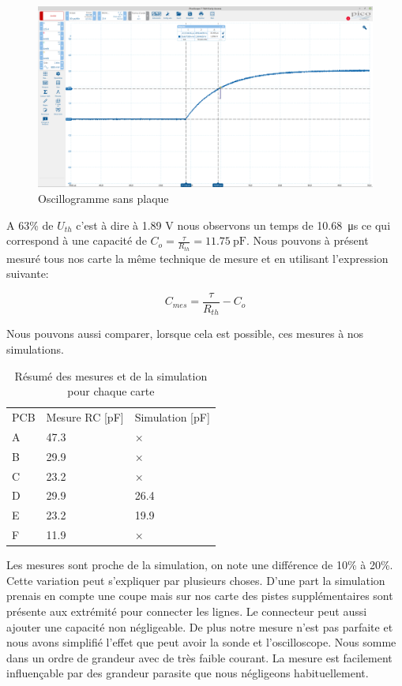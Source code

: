 \begin{figure}[!ht]
\centering
 \includegraphics[width=14cm]{videe.png}
 \caption{Oscillogramme sans plaque}
\end{figure}

A 63\% de $U_{th}$ c'est à dire à 1.89 V nous observons un temps de \SI{10.68}{\micro\second} ce qui correspond à une capacité de $C_o = \frac{\tau}{R_{th}}= \SI{11.75}{\pico\farad}$. Nous pouvons à présent mesuré tous nos carte la même technique de mesure et en utilisant l'expression suivante:

\begin{equation}
 C_{mes} = \frac{\tau}{R_{th}} - C_o
\end{equation}

Nous pouvons aussi comparer, lorsque cela est possible, ces mesures à nos simulations. 

\begin{table}[!ht]
\begin{center}
\begin{tabular}[c]{lll}
PCB & Mesure RC [pF] & Simulation [pF]\\
A & 47.3 & ×\\
B & 29.9 & ×\\
C & 23.2 & ×\\
D & 29.9 & 26.4\\
E & 23.2 & 19.9\\
F & 11.9 & ×
\end{tabular}
\caption{Résumé des mesures et de la simulation pour chaque carte }
\end{center}
\end{table}


Les mesures sont proche de la simulation, on note une différence de 10\% à 20\%. Cette variation peut s'expliquer par plusieurs choses. D'une part la simulation prenais en compte une coupe mais sur nos carte des pistes supplémentaires sont présente aux extrémité pour connecter les lignes. Le connecteur peut aussi ajouter une capacité non négligeable. De plus notre mesure n'est pas parfaite et nous avons simplifié l'effet que peut avoir la sonde et l'oscilloscope. Nous somme dans un ordre de grandeur avec de très faible courant. La mesure est facilement influençable par des grandeur parasite que nous négligeons habituellement. 

